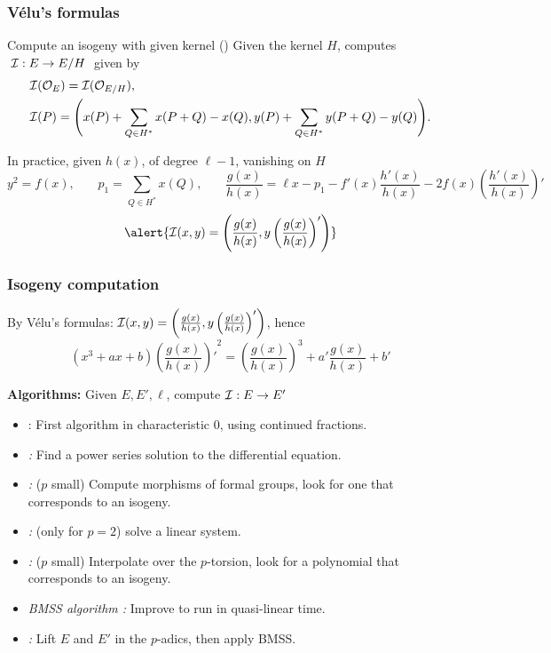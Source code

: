 \documentclass[10pt,usepdftitle=false]{beamer}
\begin{document}
\begin{frame}
  \frametitle{Vélu's formulas}
  
  \begin{block}{Compute an isogeny with given kernel (\cite{velu71})}
    Given the kernel $H$, computes $\;\mathcal{I} : E\to E/H\;$ given by
    \begin{align*}
      &\mathcal{I}(\mathcal{O}_E) = \mathcal{I}(\mathcal{O}_{E/H})\text{,}\\
      &\begin{aligned}
        \mathcal{I}(P) = \Biggl(x(P) + \sum_{Q\in H^\ast}x(P+Q) - x(Q),
        y(P) + \sum_{Q\in H^\ast}y(P+Q) - y(Q) \Biggr) \text{.}
      \end{aligned}
    \end{align*}
  \end{block}

  \begin{block}{In practice, given $h(x)$, of degree $\ell-1$,
      vanishing on $H$}
    {\footnotesize
      \[
      y^2 = f(x)\text{,}
      \qquad
      p_1 = \sum_{Q\in H^\ast} x(Q)\text{,}
      \qquad
      \frac{g(x)}{h(x)} = \ell x - p_1 - f'(x)\frac{h'(x)}{h(x)} - 2f(x)\left(\frac{h'(x)}{h(x)}\right)'\]}
    \[\alert{\I(x,y) = \left(\frac{g(x)}{h(x)}, y\left(\frac{g(x)}{h(x)}\right)'\right)}\]
  \end{block}
\end{frame}


\begin{frame}
  \frametitle{Isogeny computation}
  By Vélu's formulas: $\mathcal{I}(x,y) = \left(\frac{g(x)}{h(x)},
    y\left(\frac{g(x)}{h(x)}\right)'\right)$, hence
  \[(x^3 + ax + b){\left(\frac{g(x)}{h(x)}\right)'}^2 =
  \left(\frac{g(x)}{h(x)}\right)^3 + a'\frac{g(x)}{h(x)} + b'\]
  
  \begin{block}{\textbf{Algorithms:} Given $E, E', \ell$, compute $\mathcal{I}:E\to E'$}
    \begin{itemize}
    \item \emph{\cite{strak73}}: First algorithm in characteristic
      $0$, using continued fractions.
    \item \emph{\cite{elkies92,elkies98}:} Find a power series
      solution to the differential equation.
    \item \emph{\cite{couveignes94}:} ($p$ small) Compute morphisms of
      formal groups, look for one that corresponds to an isogeny.
    \item \emph{\cite{lercier96}:} (only for $p=2$) solve a linear
      system.
    \item \emph{\cite{couveignes96}:} ($p$ small) Interpolate over the
      $p$-torsion, look for a polynomial that corresponds to an
      isogeny.
    \item \emph{BMSS
        algorithm \parencite{bostan+morain+salvy+schost08}:} Improve
      \cite{elkies98} to run in quasi-linear time.
    \item \emph{\cite{lercier+sirvent08}:} Lift $E$ and $E'$ in the
      $p$-adics, then apply BMSS.
    \end{itemize}
  \end{block}
\end{frame}
\end{document}

